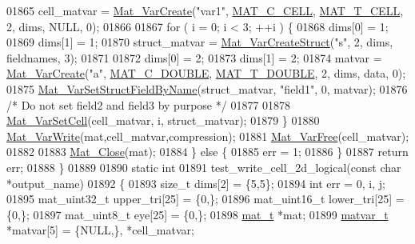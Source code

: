 \begin{DoxyCode}
{{{{{01865         cell\_matvar = \hyperlink{group___m_a_t_ga1c54a84bb4d810c6fccdb8869489eac4}{Mat\_VarCreate}(\textcolor{stringliteral}{"var1"}, \hyperlink{group___m_a_t_ggad4d60ae7b709fc81bfd744fb4c857c40a2f7abb47a1c51e248bd4e5e03cc81b08}{MAT\_C\_CELL}, 
      \hyperlink{group___m_a_t_ggacf7b3b879282b7ab3a51190e49bf3453a07599cf2cca6d2b2d059378563318ba5}{MAT\_T\_CELL}, 2, dims, NULL, 0);
01866 
01867         \textcolor{keywordflow}{for} ( i = 0; i < 3; ++i ) \{
01868             dims[0] = 1;
01869             dims[1] = 1;
01870             struct\_matvar = \hyperlink{group___m_a_t_gacecdb682a50977e54ecbdc54ed5c31bf}{Mat\_VarCreateStruct}(\textcolor{stringliteral}{"s"}, 2, dims, fieldnames, 3);
01871 
01872             dims[0] = 2;
01873             dims[1] = 2;
01874             matvar = \hyperlink{group___m_a_t_ga1c54a84bb4d810c6fccdb8869489eac4}{Mat\_VarCreate}(\textcolor{stringliteral}{"a"}, \hyperlink{group___m_a_t_ggad4d60ae7b709fc81bfd744fb4c857c40a5d70e0862e5bdb7bd86bf7ba5948f307}{MAT\_C\_DOUBLE}, 
      \hyperlink{group___m_a_t_ggacf7b3b879282b7ab3a51190e49bf3453a31e721ecf7e188196f83c32838288797}{MAT\_T\_DOUBLE}, 2, dims, data, 0);
01875             \hyperlink{group___m_a_t_ga702f2b853c605c94a8af50555fc7183b}{Mat\_VarSetStructFieldByName}(struct\_matvar, \textcolor{stringliteral}{"field1"}, 0, matvar);
01876             \textcolor{comment}{/* Do not set field2 and field3 by purpose */}
01877 
01878             \hyperlink{group___m_a_t_ga1b2c36f27ba592206c22c584a30a3c5c}{Mat\_VarSetCell}(cell\_matvar, i, struct\_matvar);
01879         \}
01880         \hyperlink{group___m_a_t_ga4bd3eba12df415d8226e27c457fbbb0b}{Mat\_VarWrite}(mat,cell\_matvar,compression);
01881         \hyperlink{group___m_a_t_ga1d14716f7450530fd1c9d02413787f0e}{Mat\_VarFree}(cell\_matvar);
01882 
01883         \hyperlink{group___m_a_t_ga101c92ff7bde4a2d4615661beba09262}{Mat\_Close}(mat);
01884     \} \textcolor{keywordflow}{else} \{
01885         err = 1;
01886     \}
01887     \textcolor{keywordflow}{return} err;
01888 \}
01889 
01890 \textcolor{keyword}{static} \textcolor{keywordtype}{int}
01891 test\_write\_cell\_2d\_logical(\textcolor{keyword}{const} \textcolor{keywordtype}{char} *output\_name)
01892 \{
01893     \textcolor{keywordtype}{size\_t} dims[2] = \{5,5\};
01894     \textcolor{keywordtype}{int}    err = 0, i, j;
01895     mat\_uint32\_t   upper\_tri[25] = \{0,\};
01896     mat\_uint16\_t   lower\_tri[25] = \{0,\};
01897     mat\_uint8\_t    eye[25] = \{0,\};
01898     \hyperlink{struct__mat__t}{mat\_t} *mat;
01899     \hyperlink{group___m_a_t_structmatvar__t}{matvar\_t} *matvar[5] = \{NULL,\}, *cell\_matvar;
}}}}}
\end{DoxyCode}
